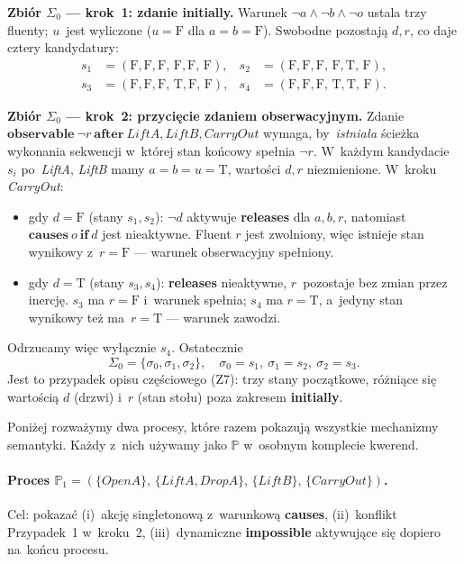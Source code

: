 \documentclass[11pt,a4paper]{article}
\newcommand{\causes}{\textbf{causes}}
\newcommand{\aft}{\textbf{after}}
\renewcommand{\iff}{\textbf{if}}
\newcommand{\initially}{\textbf{initially}}
\newcommand{\impossible}{\textbf{impossible}}
\newcommand{\releases}{\textbf{releases}}
\newcommand{\observable}{\textbf{observable}}
\theoremstyle{definition}
\begin{document}
\medskip
\noindent\textbf{Zbiór $\Sigma_0$ --- krok~1: zdanie \initially{}.}
Warunek $\neg a \land \neg b \land \neg o$ ustala trzy fluenty;
$u$~jest wyliczone ($u = \text{F}$ dla $a = b = \text{F}$).
Swobodne pozostają $d, r$, co daje cztery kandydatury:
\begin{align*}
  s_1 &= (\text{F},\text{F},\text{F},\,\text{F},\text{F},\,\text{F}), &
  s_2 &= (\text{F},\text{F},\text{F},\,\text{F},\text{T},\,\text{F}), \\
  s_3 &= (\text{F},\text{F},\text{F},\,\text{T},\text{F},\,\text{F}), &
  s_4 &= (\text{F},\text{F},\text{F},\,\text{T},\text{T},\,\text{F}).
\end{align*}

\medskip
\noindent\textbf{Zbiór $\Sigma_0$ --- krok~2: przycięcie zdaniem obserwacyjnym.}
Zdanie $\observable\ \neg r\ \aft\ \mathit{LiftA}, \mathit{LiftB}, \mathit{CarryOut}$
wymaga, by~\emph{istniała} ścieżka wykonania sekwencji w~której stan końcowy
spełnia $\neg r$. W~każdym kandydacie $s_i$ po~\textit{LiftA}, \textit{LiftB}
mamy $a = b = u = \text{T}$, wartości $d, r$ niezmienione. W~kroku \textit{CarryOut}:
\begin{itemize}[topsep=2pt]
  \item gdy $d = \text{F}$ (stany $s_1, s_2$): $\neg d$ aktywuje \releases{}
        dla $a, b, r$, natomiast $\causes\ o\ \iff\ d$ jest nieaktywne.
        Fluent $r$ jest zwolniony, więc istnieje stan wynikowy z~$r = \text{F}$
        --- warunek obserwacyjny spełniony.
  \item gdy $d = \text{T}$ (stany $s_3, s_4$): \releases{} nieaktywne,
        $r$~pozostaje bez zmian przez inercję.
        $s_3$ ma $r = \text{F}$ i~warunek spełnia; $s_4$ ma $r = \text{T}$,
        a~jedyny stan wynikowy też ma~$r = \text{T}$ --- warunek zawodzi.
\end{itemize}
Odrzucamy więc wyłącznie $s_4$. Ostatecznie
\[
  \Sigma_0 = \{\sigma_0, \sigma_1, \sigma_2\}, \quad
  \sigma_0 = s_1,\ \sigma_1 = s_2,\ \sigma_2 = s_3.
\]
Jest to przypadek opisu częściowego (Z7): trzy stany początkowe, różniące
się wartością $d$ (drzwi) i~$r$ (stan stołu) poza zakresem \initially{}.

\medskip
\noindent Poniżej rozważymy dwa procesy, które razem pokazują wszystkie
mechanizmy semantyki. Każdy z~nich używamy jako $\mathbb{P}$ w~osobnym
komplecie kwerend.

\paragraph{Proces $\mathbb{P}_1 = (\{\mathit{OpenA}\},\, \{\mathit{LiftA}, \mathit{DropA}\},\,
\{\mathit{LiftB}\},\, \{\mathit{CarryOut}\})$.}
Cel: pokazać (i)~akcję singletonową z~warunkową \causes{},
(ii)~konflikt Przypadek~1 w~kroku~2,
(iii)~dynamiczne \impossible{} aktywujące się dopiero na~końcu procesu.
\end{document}
